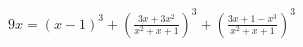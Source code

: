 \documentclass[preview]{standalone}
\begin{document}
\begin{center}
$9x=(x-1)^3+\left(\frac{3x+3x^2}{x^2+x+1}\right)^3+\left(\frac{3x+1-x^3}{x^2+x+1}\right)^3$
\end{center}
\end{document}
